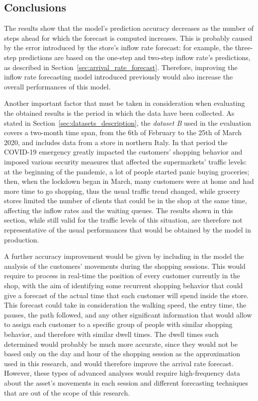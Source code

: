 \subsection{Conclusions}
\label{subsec:arrival_rate_forecast_results_conclusions}

The results show that the model’s prediction accuracy decreases as the number of steps ahead for which the forecast is computed increases. This is probably caused by the error introduced by the store’s inflow rate forecast: for example, the three-step predictions are based on the one-step and two-step inflow rate’s predictions, as described in Section~\ref{sec:arrival_rate_forecast}. Therefore, improving the inflow rate forecasting model introduced previously would also increase the overall performances of this model.

Another important factor that must be taken in consideration when evaluating the obtained results is the period in which the data have been collected. As stated in Section~\ref{sec:datasets_description}, the \emph{dataset B} used in the evaluation covers a two-month time span, from the 6th of February to the 25th of March 2020, and includes data from a store in northern Italy. In that period the COVID-19 emergency greatly impacted the customers' shopping behavior and imposed various security measures that affected the supermarkets' traffic levels: at the beginning of the pandemic, a lot of people started panic buying groceries; then, when the lockdown began in March, many customers were at home and had more time to go shopping, thus the usual traffic trend changed, while grocery stores limited the number of clients that could be in the shop at the same time, affecting the inflow rates and the waiting queues. The results shown in this section, while still valid for the traffic levels of this situation, are therefore not representative of the usual performances that would be obtained by the model in production.

A further accuracy improvement would be given by including in the model the analysis of the customers’ movements during the shopping sessions. This would require to process in real-time the position of every customer currently in the shop, with the aim of identifying some recurrent shopping behavior that could give a forecast of the actual time that each customer will spend inside the store. This forecast could take in consideration the walking speed, the entry time, the pauses, the path followed, and any other significant information that would allow to assign each customer to a specific group of people with similar shopping behavior, and therefore with similar dwell times. The dwell times such determined would probably be much more accurate, since they would not be based only on the day and hour of the shopping session as the approximation used in this research, and would therefore improve the arrival rate forecast. However, these types of advanced analyses would require high-frequency data about the asset’s movements in each session and different forecasting techniques that are out of the scope of this research.

